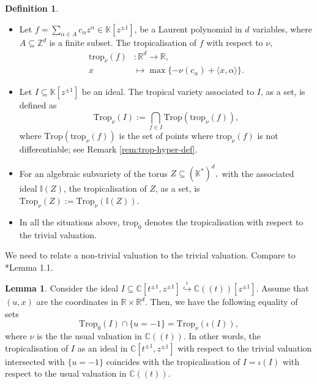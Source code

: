 \documentclass[11pt]{amsart}
\def\Log{{\rm Log}}
\theoremstyle{definition}
\newtheorem{definition}[theorem]{Definition}
\newtheorem{lemma}[theorem]{Lemma}
\newcommand{\R}{\mathbb{R}}
\newcommand{\lto}{\longrightarrow}
\newcommand{\C}{\mathbb{C}}
\newcommand{\trop}{\mathrm{trop}}
\newcommand{\fq}{\mathfrak{q}}
\newcommand{\Trop}{\mathrm{Trop}}
\begin{document}
\begin{definition}
 \begin{itemize}
     \item [(a)] Let $f= \sum_{\alpha\in A}c_{\alpha} z^{\alpha} \in \mathbb{K}[z^{\pm 1}]$, be a Laurent polynomial in $d$ variables, where $A\subseteq \mathbb{Z}^d$ is a finite subset.  The tropicalisation of $f$ with respect to $\nu,$ 
         \begin{align*}
            \trop_{\nu}(f)&: \R^d \lto \R, \\
              x &\mapsto \max \{-\nu(c_{\alpha}) + \langle x, \alpha \rangle \}.
       \end{align*}


    
\item [(b)] Let $I \subseteq \mathbb{K}[z^{\pm 1}]$ be an ideal. The tropical variety associated to $I$, as a set, is defined as 
$${\text{Trop}_{\nu}}(I) := \bigcap_{f \in I} \text{Trop}(\trop_{\nu}(f)),$$
where $\text{Trop}(\trop_{\nu}(f))$ is the set of points where $\trop_{\nu}(f)$ is not differentiable; see Remark \ref{rem:trop-hyper-def}. 

\item [(c)] For an algebraic subvariety of the torus $Z \subseteq {(\mathbb{K}^*)}^d,$ with the associated ideal $\mathbb{I}(Z)$, the tropicalisation of $Z$, as a set, is $\Trop_{\nu}(Z):= \Trop_{\nu}(\mathbb{I}(Z)).$ 
\item [(d)] In all the situations above, $\trop_0$ denotes the tropicalisation with respect to the trivial valuation.
 \end{itemize}    
\end{definition}
We need to relate a non-trivial valuation to the trivial valuation. Compare to \cite{BJSST}*{Lemma 1.1}.
\begin{lemma}\label{lem:int-1}
Consider the ideal $I \subseteq \C[t^{\pm 1}, z^{\pm 1}] \stackrel{\iota}{\hookrightarrow}
 \C((t))[z^{\pm 1}].$ Assume that $(u,x)$ are the coordinates in $ \R\times \R^d$.  Then, we have the following equality of sets
$$
\Trop_0(I)  \cap \{u= -1 \} = \Trop_{\nu}(\iota(I)),
$$
where $\nu$ is the the usual valuation in $\C((t)).$ In other words, the tropicalisation of $I$ as an ideal in $\C[t^{\pm 1},z^{\pm 1}]$ with respect to the trivial valuation intersected with $\{u= -1\}$ coincides with the tropicalisation of $I =\iota(I)$ with respect to the usual valuation in $\C((t)).$ 
\end{lemma}
\end{document}
